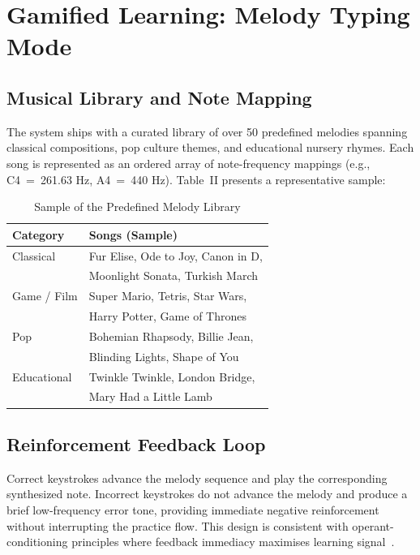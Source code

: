 \documentclass[conference]{IEEEtran}
\begin{document}
\section{Gamified Learning: Melody Typing Mode}

\subsection{Musical Library and Note Mapping}

The system ships with a curated library of over 50 predefined
melodies spanning classical compositions, pop culture themes, and
educational nursery rhymes. Each song is represented as an ordered
array of note-frequency mappings (e.g., C4~=~261.63 Hz, A4~=~440
Hz). Table~II presents a representative sample:

\begin{table}[h]
\centering
\caption{Sample of the Predefined Melody Library}
\begin{tabular}{ll}
\toprule
\textbf{Category}   & \textbf{Songs (Sample)} \\
\midrule
Classical           & Fur Elise, Ode to Joy, Canon in D, \\
                    & Moonlight Sonata, Turkish March \\
Game / Film         & Super Mario, Tetris, Star Wars, \\
                    & Harry Potter, Game of Thrones \\
Pop                 & Bohemian Rhapsody, Billie Jean, \\
                    & Blinding Lights, Shape of You \\
Educational         & Twinkle Twinkle, London Bridge, \\
                    & Mary Had a Little Lamb \\
\bottomrule
\end{tabular}
\end{table}

\subsection{Reinforcement Feedback Loop}

Correct keystrokes advance the melody sequence and play the
corresponding synthesized note. Incorrect keystrokes do not advance
the melody and produce a brief low-frequency error tone, providing
immediate negative reinforcement without interrupting the practice
flow. This design is consistent with operant-conditioning principles
where feedback immediacy maximises learning signal~\cite{mayer2014}.
\end{document}
